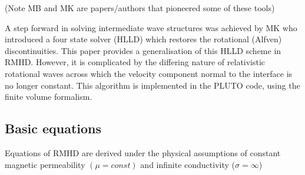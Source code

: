 \documentclass{article}
\begin{document}
(Note MB and MK are papers/authors that pioneered some of these tools) 

A step forward in solving intermediate wave structures was achieved by MK who introduced a four state solver (HLLD) which restores the rotational (Alfven) discontinuities. This paper provides a generalisation of this HLLD scheme in RMHD. However, it is complicated by the differing nature of relativistic rotational waves across which the velocity component normal to the interface is no longer constant. This algorithm is implemented in the PLUTO code, using the finite volume formalism. 

\subsection{Basic equations}

Equations of RMHD are derived under the physical assumptions of constant magnetic permeability $(\mu=const)$ and infinite conductivity ($\sigma=\infty$)




\end{document}
